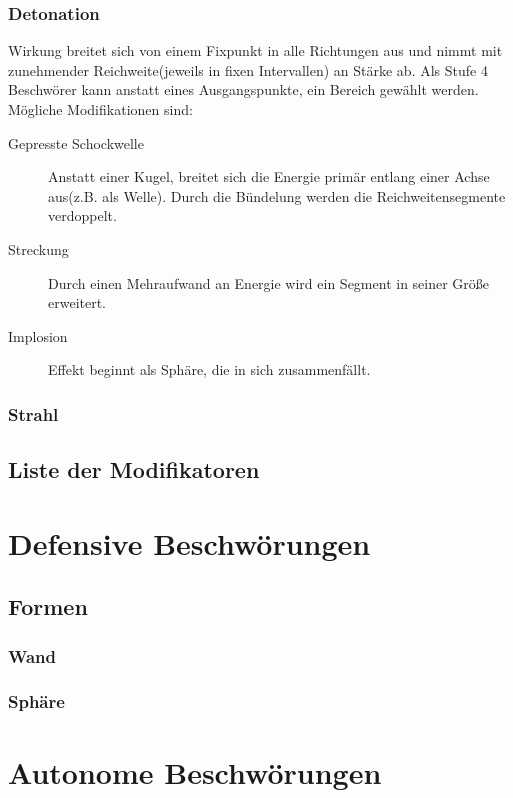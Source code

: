\documentclass[a4paper,12pt,oneside]{book}
\begin{document}
\section{Detonation}
Wirkung breitet sich von einem Fixpunkt in alle Richtungen aus und nimmt mit zunehmender Reichweite(jeweils in fixen Intervallen) an Stärke ab. Als Stufe 4 Beschwörer kann anstatt eines Ausgangspunkte, ein Bereich gewählt werden. Mögliche Modifikationen sind:
\begin{description}
\item[Gepresste Schockwelle]Anstatt einer Kugel, breitet sich die Energie primär entlang einer Achse aus(z.B. als Welle). Durch die Bündelung werden die Reichweitensegmente verdoppelt. 
\item[Streckung]Durch einen Mehraufwand an Energie wird ein Segment in seiner Größe erweitert.
\item[Implosion]Effekt beginnt als Sphäre, die in sich zusammenfällt.
\end{description}

\section{Strahl}

\chapter{Liste der Modifikatoren}

\part{Defensive Beschwörungen}

\chapter{Formen}

\section{Wand}

\section{Sphäre}

\part{Autonome Beschwörungen}
\end{document}
